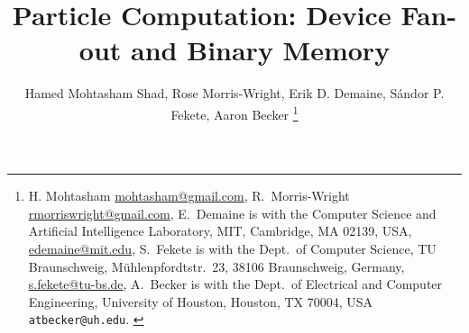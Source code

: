 \documentclass[letterpaper, 10 pt, conference]{ieeeconf}
\begin{document}

\title{\LARGE \bf 
Particle Computation:  Device Fan-out and Binary Memory 
}
\author{
Hamed Mohtasham Shad,
Rose Morris-Wright,
Erik D. Demaine,
S\'andor P. Fekete,
Aaron Becker
\thanks{{
H. Mohtasham  \protect\url{mohtasham@gmail.com},
R.~Morris-Wright  \protect\url{rmorriswright@gmail.com},
E.~Demaine is with the Computer Science and Artificial Intelligence Laboratory, MIT, Cambridge, MA 02139, USA,      \protect\url{edemaine@mit.edu},
S.~Fekete is with the Dept.~of Computer Science, TU Braunschweig,  M\"uhlenpfordtstr.~23, 38106 Braunschweig, Germany,
      \protect\url{s.fekete@tu-bs.de},
A.~Becker is with the  Dept.~of Electrical and Computer Engineering,  University of Houston, Houston, TX 70004, USA {\tt\small atbecker@uh.edu}.
}
} %
} %
\maketitle
\end{document}
